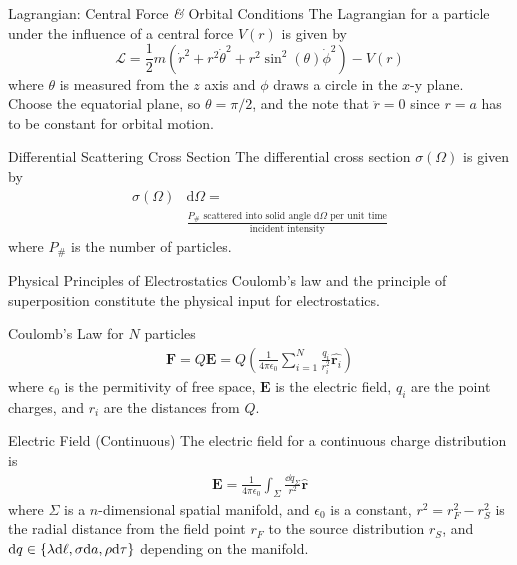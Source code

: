 \documentclass[avery5371,grid]{flashcards}
\begin{document}
\begin{flashcard}[Definition]{Lagrangian: Central Force \textit{\&} Orbital Conditions}
	The Lagrangian for a particle under the influence of a central force $V(r)$ is given by
	\begin{equation*}
		\mathcal{L} = \frac{1}{2}m(\dot{r}^2+ r^2\dot{\theta}^2 + r^2\sin^2(\theta)\dot{\phi}^2) - V(r)
	\end{equation*}
	where $\theta$ is measured from the $z$ axis and $\phi$ draws a circle in the $x$-y plane. Choose the equatorial plane, so $\theta = \pi/2$, and the note that $\ddot{r}=0$ since $r=a$ has to be constant for orbital motion.
\end{flashcard}

\begin{flashcard}[Definition]{Differential Scattering Cross Section}
	The differential cross section $\sigma(\Omega)$ is given by
	\begin{align*}
		\sigma(\Omega)&\text{d}\Omega =\\
		&\frac{P_{\#}\text{ scattered into solid angle $\text{d}\Omega$ per unit time}}{\text{incident intensity}}
	\end{align*}
	where $P_{\#}$ is the number of particles.
\end{flashcard}



\begin{flashcard}[Theory]{Physical Principles of Electrostatics}
	Coulomb's law and the principle of superposition constitute the physical input for electrostatics.
\end{flashcard}

\begin{flashcard}[Definition]{Coulomb's Law for $N$ particles}
	\begin{align*}
		\mathbf{F} = Q\mathbf{E} = Q\left(\frac{1}{4\pi \epsilon_0}\sum_{i=1}^{N}\frac{q_i}{r_i^2}\hat{\mathbf{r}_i}\right)
	\end{align*}
	where $\epsilon_0$ is the permitivity of free space, $\mathbf{E}$ is the electric field, $q_i$ are the point charges, and $r_i$ are the distances from $Q$.
\end{flashcard}

\begin{flashcard}[Definition]{Electric Field (Continuous)}
	The electric field for a continuous charge distribution is 
	\begin{align*}
		\mathbf{E} = \frac{1}{4\pi\epsilon_0}\int_{\Sigma} \frac{\dd q_\Sigma}{r^2}\hat{\boldsymbol{r}}
	\end{align*}
	where $\Sigma$ is a $n$-dimensional spatial manifold, and $\epsilon_0$ is a constant, $r^2 = r_F^2-r_S^2$ is the radial distance from the field point $r_F$ to the source distribution $r_S$, and $\dd q\in\qty{\lambda\dd\ell,\sigma\dd a,\rho\dd\tau}$ depending on the manifold.
\end{flashcard}
\end{document}
